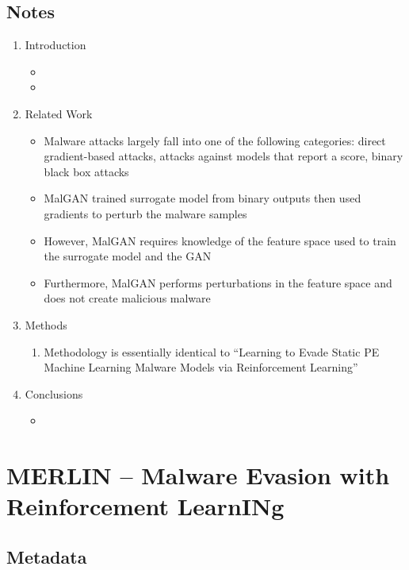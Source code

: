 \documentclass{article}
\begin{document}
\subsection*{Notes}

\begin{enumerate}
	\item Introduction
	\begin{itemize}
		\item 
		\item 
	\end{itemize}
	\item Related Work
	\begin{itemize}
		\item Malware attacks largely fall into one of the following categories: direct gradient-based attacks, attacks against models that report a score, binary black box attacks
		\item MalGAN trained surrogate model from binary outputs then used gradients to perturb the malware samples
		\item However, MalGAN requires knowledge of the feature space used to train the surrogate model and the GAN
		\item Furthermore, MalGAN performs perturbations in the feature space and does not create malicious malware
	\end{itemize}
	\item Methods
	\begin{enumerate}
		\item Methodology is essentially identical to ``Learning to Evade Static PE Machine Learning Malware Models via Reinforcement Learning''
	\end{enumerate}
	\item Conclusions
	\begin{itemize}
		\item 
	\end{itemize}
\end{enumerate}
\pagebreak


\section*{MERLIN -- Malware Evasion with Reinforcement LearnINg}

\subsection*{Metadata}
\end{document}

